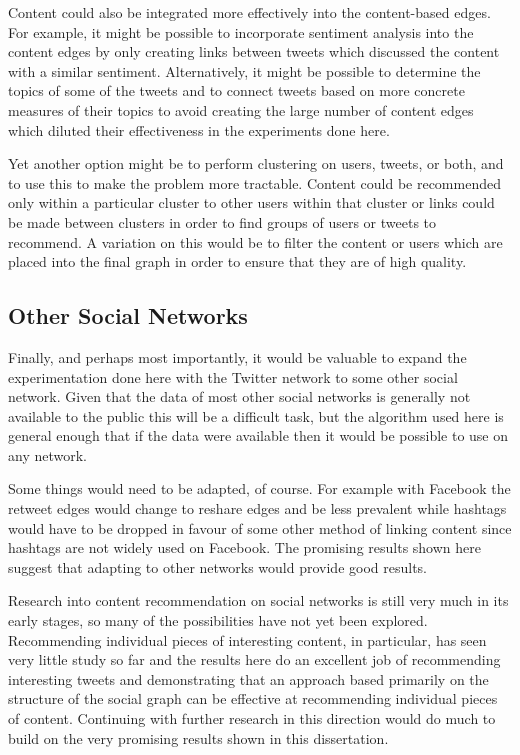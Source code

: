 Content could also be integrated more effectively into the content-based edges. For example, it might be possible to incorporate sentiment analysis into the content edges by only creating links between tweets which discussed the content with a similar sentiment. Alternatively, it might be possible to determine the topics of some of the tweets and to connect tweets based on more concrete measures of their topics to avoid creating the large number of content edges which diluted their effectiveness in the experiments done here.

Yet another option might be to perform clustering on users, tweets, or both, and to use this to make the problem more tractable. Content could be recommended only within a particular cluster to other users within that cluster or links could be made between clusters in order to find groups of users or tweets to recommend. A variation on this would be to filter the content or users which are placed into the final graph in order to ensure that they are of high quality.

\subsection{Other Social Networks}

Finally, and perhaps most importantly, it would be valuable to expand the experimentation done here with the Twitter network to some other social network. Given that the data of most other social networks is generally not available to the public this will be a difficult task, but the algorithm used here is general enough that if the data were available then it would be possible to use on any network.

Some things would need to be adapted, of course. For example with Facebook the retweet edges would change to reshare edges and be less prevalent while hashtags would have to be dropped in favour of some other method of linking content since hashtags are not widely used on Facebook. The promising results shown here suggest that adapting to other networks would provide good results.

Research into content recommendation on social networks is still very much in its early stages, so many of the possibilities have not yet been explored. Recommending individual pieces of interesting content, in particular, has seen very little study so far and the results here do an excellent job of recommending interesting tweets and demonstrating that an approach based primarily on the structure of the social graph can be effective at recommending individual pieces of content. Continuing with further research in this direction would do much to build on the very promising results shown in this dissertation. 

